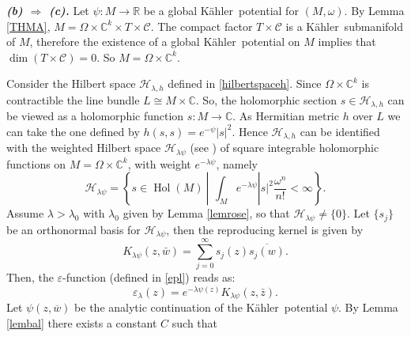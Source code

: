 \documentclass[reqno]{amsart}
\begin{document}
\emph{\bf (b) $\Rightarrow$ (c).} Let $\psi: M {\rightarrow} {\mathbb{R}}$ be a global {K\"{a}hler}\ potential for $(M, \omega)$. By Lemma \ref{THMA}, $M=\Omega \times {\mathbb{C}}^k\times T \times {\mathcal C}$. The compact factor $T \times {\mathcal C}$ is a {K\"{a}hler}\ submanifold of $M$, therefore the existence of a global {K\"{a}hler}\ potential on $M$ implies that $\dim(T \times {\mathcal C})=0$. So $M=\Omega\times {\mathbb{C}}^k$. 

Consider the Hilbert space ${\mathcal{H}}_{{\lambda}, h}$ defined in \eqref{hilbertspaceh}. 
Since $\Omega\times {\mathbb{C}}^k$ is contractible the line bundle $L \cong M \times {\mathbb{C}}$. So, the holomorphic section $s \in {\mathcal{H}}_{{\lambda}, h}$ can be viewed as a holomorphic function $s:M {\rightarrow} {\mathbb{C}}$. As Hermitian metric $h$ over $L$ we can take the one defined by $h(s,s)= e^{-\psi} |s|^2$. Hence ${\mathcal{H}}_{{\lambda}, h}$ can be identified with the weighted Hilbert space ${\mathcal{H}}_{{\lambda}\psi}$ (see \cite{LMZ03}) of square integrable holomorphic functions on $M=\Omega \times {\mathbb{C}}^k$, with weight $e^{-{\lambda}\psi}$, namely
\begin{equation}\label{hilbertspacePhi}
{\mathcal{H}}_{{\lambda}\psi}=\left\{ s\in{\operatorname{Hol}}(M) \ | \ \, \int_M e^{-{\lambda}\psi}|s|^2\frac{\omega^n}{n!}<\infty\right\}.
\end{equation}
Assume ${\lambda} > {\lambda}_0$ with ${\lambda}_0$ given by  Lemma \ref{lemrose}, so that ${\mathcal{H}}_{{\lambda}\psi}\neq \{0\}$. Let $\{s_j\}$ be an orthonormal basis for ${\mathcal{H}}_{{\lambda}\psi}$, then the reproducing kernel is given by
$$K_{{\lambda}\psi}(z, \bar w)=\sum_{j=0}^\infty s_j(z) {\overline{{s_j(w)}}} .$$
Then, the ${{\varepsilon}}$-function (defined in \eqref{epl}) reads as: 
\begin{equation}\label{epsilon}
\varepsilon_{\lambda}(z)=e^{-{\lambda}\psi(z)}K_{{\lambda}\psi}(z,\bar  z).
\end{equation}
Let $ \psi \left( z,{\overline{w}}\right) $ be the analytic continuation of the {K\"{a}hler}\ potential $\psi$. By Lemma \ref{lembal} there exists a constant $C$ such that
\end{document}

